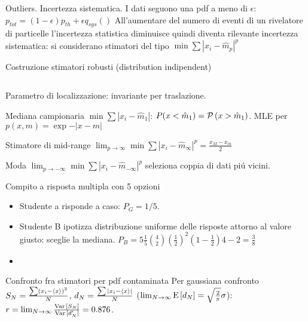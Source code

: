 \begin{frame}{Outliers. Incertezza sistematica.}
I dati seguono una pdf a meno di $\epsilon$: $p_{tot}=(1-\epsilon)p_{th}+\epsilon q_{sys}()$
All'aumentare del numero di eventi di un rivelatore di particelle l'incertezza statistica diminuisce quindi diventa rilevante incertezza sistematica: si considerano stimatori del tipo $\min\sum|x_i-\hat{m}_p|^p$
\begin{block}{Costruzione stimatori robusti (distribution indipendent)}
\begin{columns}[T]
\begin{column}{0.5\textwidth}
\end{column}
\begin{column}{0.5\textwidth}
\end{column}
\end{columns}
Parametro di localizzazione: invariante per traslazione.
\end{block}
\begin{block}{Mediana campionaria}
$\min\sum|x_i-\hat{m}_1|$: $P(x<\hat{m}_1)=\operatorname{\mathcal{P}}{(x>\hat{m}_1)}$. MLE per $p(x,m)=\exp{-|x-m|}$
\end{block}
\begin{block}{Stimatore di mid-range}
$\lim_{p\to\infty}\min\sum|x_i-\hat{m}_{\infty}|^p=\frac{x_M-x_m}{2}$
\end{block}
\begin{block}{Moda}
$\lim_{p\to-\infty}\min\sum|x_i-\hat{m}_{-\infty}|^p$ seleziona coppia di dati pi\'u vicini.
\end{block}
\end{frame}

\begin{wordonframe}{}
Compito a risposta multipla con  5 opzioni
\begin{itemize}
\item Studente a risponde a caso: $P_G=1/5$.
\item Studente B ipotizza distribuzione uniforme delle risposte attorno al valore giusto: sceglie la mediana. $P_B=5\frac{1}{5}\binom{4}{2}(\frac{1}{2})^2(1-\frac{1}{2}){4-2}=\frac{3}{8}$
\item {}
\end{itemize}

\end{wordonframe}

\begin{wordonframe}{Confronto fra stimatori per pdf contaminata}
Per gaussiana confronto $S_N=\frac{\sum(x_i-\langle x \rangle)^2}{N}$, $d_N=\frac{\sum|x_i-\langle x \rangle|}{N}$ ($\lim_{N\to\infty}\operatorname{E}{[d_N]}=\sqrt{\frac{2}{\pi}}\sigma$): $r=\lim_{N\to\infty}\frac{\operatorname{Var}{[S_N]}}{\operatorname{Var}{[d_N']}}=0.876$.
\end{wordonframe}

